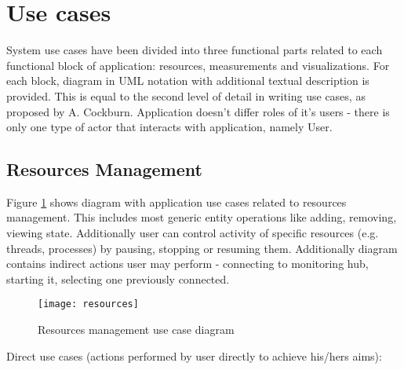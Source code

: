 %


\section{Use cases}
\label{sec:ch4_usecases}

System use cases have been divided into three functional parts related to each functional block of application:
resources, measurements and visualizations. For each block, diagram in UML notation with additional textual description
is provided. This is equal to the second level of detail in writing use cases, as proposed by A.
Cockburn\cite{0201702258}. Application doesn't differ roles of it's users - there is only one type of actor that
interacts with application, namely User.

\pagebreak

\subsection{Resources Management}
\label{subsec:resources_mgmnt}

Figure \ref{fig:usecase_resources} shows diagram with application use cases related to resources management. This
includes most generic entity operations like adding, removing, viewing state. Additionally user can control activity of
specific resources (e.g. threads, processes) by pausing, stopping or resuming them. Additionally diagram contains
indirect actions user may perform - connecting to monitoring hub, starting it, selecting one previously connected.

\begin{figure}[ht]
  \centering
  \texttt{[image: resources]}
  \caption{Resources management use case diagram}
  \label{fig:usecase_resources}
\end{figure}

Direct use cases (actions performed by user directly to achieve his/hers aims):


